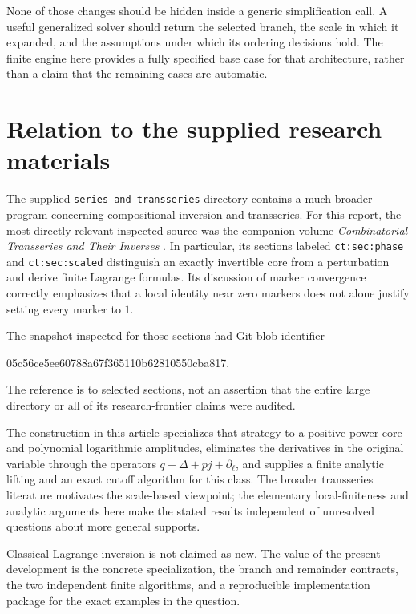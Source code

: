 \documentclass[11pt,a4paper]{article}
\numberwithin{equation}{section}
\theoremstyle{definition}\newtheorem{definition}[theorem]{Definition}
\theoremstyle{remark}\newtheorem{remark}[theorem]{Remark}
\newcommand{\code}[1]{\texttt{#1}}
\begin{document}
None of those changes should be hidden inside a generic simplification
call. A useful generalized solver should return the selected branch,
the scale in which it expanded, and the assumptions under which its
ordering decisions hold. The finite engine here provides a fully
specified base case for that architecture, rather than a claim that the
remaining cases are automatic.

\section{Relation to the supplied research materials}
\label{sec:provenance}

The supplied \code{series-and-transseries} directory contains a much
broader program concerning compositional inversion and transseries.
For this report, the most directly relevant inspected source was the
companion volume \emph{Combinatorial Transseries and Their Inverses}
\cite{companion}. In particular, its sections labeled
\code{ct:sec:phase} and \code{ct:sec:scaled} distinguish an exactly
invertible core from a perturbation and derive finite Lagrange formulas.
Its discussion of marker convergence correctly emphasizes that a local
identity near zero markers does not alone justify setting every marker
to $1$.

The snapshot inspected for those sections had Git blob identifier
\begin{center}\small\ttfamily
05c56ce5ee60788a67f365110b62810550cba817.
\end{center}
The reference is to selected sections, not an assertion that the entire
large directory or all of its research-frontier claims were audited.

The construction in this article specializes that strategy to a
positive power core and polynomial logarithmic amplitudes, eliminates
the derivatives in the original variable through the operators
$q+\Delta+pj+\partial_\ell$, and supplies a finite analytic lifting and
an exact cutoff algorithm for this class. The broader transseries
literature \cite{edgar-beginners,edgar-grids} motivates the scale-based
viewpoint; the elementary local-finiteness and analytic arguments here
make the stated results independent of unresolved questions about more
general supports.

Classical Lagrange inversion is not claimed as new. The value of the
present development is the concrete specialization, the branch and
remainder contracts, the two independent finite algorithms, and a
reproducible implementation package for the exact examples in the
question.
\end{document}
